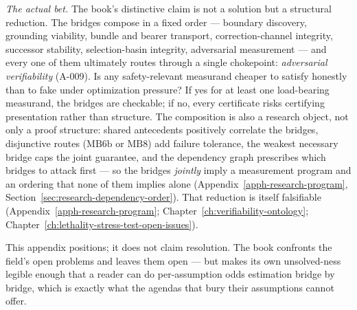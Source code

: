 \emph{The actual bet.} The book's distinctive claim is not a solution but a structural reduction.
The bridges compose in a fixed order --- boundary discovery, grounding viability, bundle and bearer transport, correction-channel integrity, successor stability, selection-basin integrity, adversarial measurement --- and every one of them ultimately routes through a single chokepoint: \emph{adversarial verifiability} (A-009).
Is any safety-relevant measurand cheaper to satisfy honestly than to fake under optimization pressure?
If yes for at least one load-bearing measurand, the bridges are checkable; if no, every certificate risks certifying presentation rather than structure.
The composition is also a research object, not only a proof structure: shared antecedents positively correlate the bridges, disjunctive routes (\(\text{MB6b}\) or \(\text{MB8}\)) add failure tolerance, the weakest necessary bridge caps the joint guarantee, and the dependency graph prescribes which bridges to attack first --- so the bridges \emph{jointly} imply a measurement program and an ordering that none of them implies alone (Appendix~\ref{apph-research-program}, Section~\ref{sec:research-dependency-order}).
That reduction is itself falsifiable (Appendix~\ref{apph-research-program}; Chapter~\ref{ch:verifiability-ontology}; Chapter~\ref{ch:lethality-stress-test-open-issues}).

This appendix positions; it does not claim resolution.
The book confronts the field's open problems and leaves them open --- but makes its own unsolved-ness legible enough that a reader can do per-assumption odds estimation bridge by bridge, which is exactly what the agendas that bury their assumptions cannot offer.
